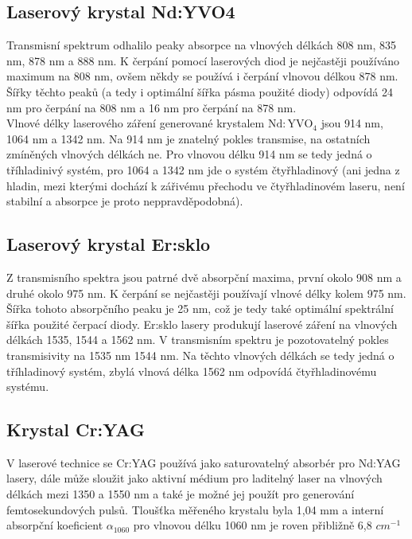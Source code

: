 	\subsection{Laserový krystal Nd:YVO4}
	Transmisní spektrum odhalilo peaky absorpce na vlnových délkách 808 nm, 835 nm, 878 nm a 888 nm. K čerpání pomocí laserových diod je nejčastěji používáno maximum na 808 nm, ovšem někdy se používá i čerpání vlnovou délkou 878 nm. Šířky těchto peaků (a tedy i optimální šířka pásma použité diody) odpovídá 24 nm pro čerpání na 808 nm a 16 nm pro čerpání na 878 nm.\\
	
	Vlnové délky laserového záření generované krystalem $\mathrm{Nd:YVO_4}$ jsou 914 nm, 1064 nm a 1342 nm. Na 914 nm je znatelný pokles transmise, na ostatních zmíněných vlnových délkách ne. Pro vlnovou délku 914 nm se tedy jedná o tříhladinivý systém, pro 1064 a 1342 nm jde o systém čtyřhladinový (ani jedna z hladin, mezi kterými dochází k zářivému přechodu ve čtyřhladinovém laseru, není stabilní a absorpce je proto neppravděpodobná).
	
	\subsection{Laserový krystal Er:sklo}
	Z transmisního spektra jsou patrné dvě absorpční maxima, první okolo 908 nm a druhé okolo 975 nm. K čerpání se nejčastěji používají vlnové délky kolem 975 nm. Šířka tohoto absorpčního peaku je 25 nm, což je tedy také optimální spektrální šířka použité čerpací diody. 
	Er:sklo lasery produkují laserové záření na vlnových délkách 1535, 1544 a 1562 nm. V transmisním spektru je pozotovatelný pokles transmisivity na 1535 nm  1544 nm. Na těchto vlnových délkách se tedy jedná o tříhladinový systém, zbylá vlnová délka 1562 nm odpovídá čtyřhladinovému systému.
	
	\subsection{Krystal Cr:YAG}
	V laserové technice se Cr:YAG používá jako saturovatelný absorbér pro Nd:YAG lasery, dále může sloužit jako aktivní médium pro laditelný laser na vlnových délkách mezi 1350 a 1550 nm a také je možné jej použít pro generování femtosekundových pulsů.
	Tloušťka měřeného krystalu byla 1,04 mm a interní absorpční koeficient $\alpha_{1060}$ pro vlnovou délku 1060 nm je roven přibližně 6,8 $\unit{cm^{-1}}$			

	\subsection{}		

